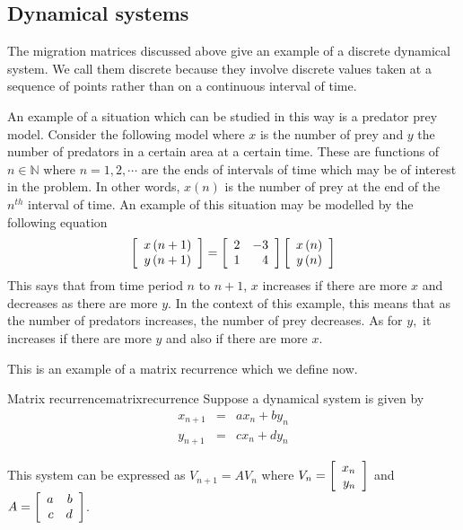 \subsection{Dynamical systems}

The migration matrices discussed above give an example of a discrete
dynamical system. We call them discrete because they involve discrete values taken at a sequence of
points rather than on a continuous interval of time. 

An example of a situation
which can be studied in this way is a predator prey model. Consider the
following model where $x$ is the number of prey and $y$ the number of
predators in a certain area at a certain time. These are functions of $n\in \mathbb{N}$ where $n=1,2,\cdots $ are
the ends of intervals of time which may be of interest in the problem. In other words, $x \left( n \right)$ is the number 
of prey at the end of the $n^{th}$ interval of time.
An example of this situation may be modelled by the following equation
\begin{equation*}
\left[
\begin{array}{c}
x\left( n+1\right) \\
y\left( n+1\right)
\end{array}
\right] =\left[
\begin{array}{rr}
2 & -3 \\
1 & 4
\end{array}
\right] \left[
\begin{array}{c}
x\left( n\right) \\
y\left( n\right)
\end{array}
\right]
\end{equation*}
This says that from time period $n$ to $n+1$, $x$ increases if there are more $x$ and decreases as there
are more $y$. In the context of this example, this means that as the number of predators increases,
the number of prey decreases. As for $y,$ it increases if there are more $y$ and also if
there are more $x$.

This is an example of a matrix recurrence which we define now. 

\begin{definition}{Matrix recurrence}{matrixrecurrence}
Suppose a dynamical system is given by  
\begin{eqnarray*}
x_{n+1} &=& a x_n + b y_n \\
y_{n+1} &=& c x_n + d y_n
\end{eqnarray*}

This system can be expressed as $V_{n+1} = A V_{n}$ where $V_{n} = \left[ \begin{array}{r}
x_n \\
y_n
\end{array}
\right]$ and $A = \left[ \begin{array}{rr}
a & b \\
c & d 
\end{array} \right]$.  
\end{definition}


